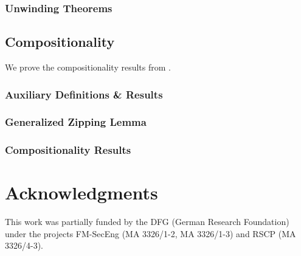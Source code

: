 \documentclass[10pt,a4paper]{article}
\begin{document}
\subsubsection{Unwinding Theorems}


\subsection{Compositionality}
We prove the compositionality results from {\cite{phd:Mantel2003}}.

\subsubsection{Auxiliary Definitions \& Results}



\subsubsection{Generalized Zipping Lemma}


\subsubsection{Compositionality Results}



\section*{Acknowledgments}
This work was partially funded by the DFG (German Research Foundation) under the
projects FM-SecEng (MA 3326/1-2, MA 3326/1-3) and RSCP (MA 3326/4-3). 



\end{document}
